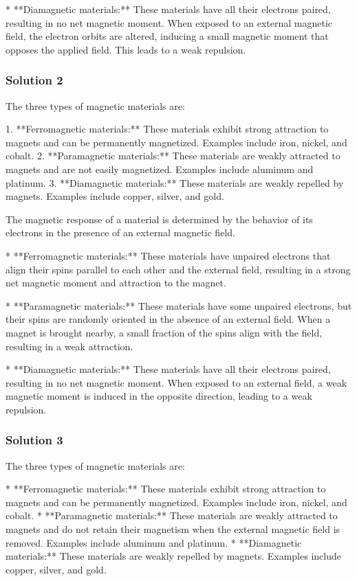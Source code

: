 \documentclass{article}
\begin{document}
*   **Diamagnetic materials:** These materials have all their electrons paired, resulting in no net magnetic moment. When exposed to an external magnetic field, the electron orbits are altered, inducing a small magnetic moment that opposes the applied field. This leads to a weak repulsion.


\subsubsection{Solution 2}
The three types of magnetic materials are:

1.  **Ferromagnetic materials:** These materials exhibit strong attraction to magnets and can be permanently magnetized. Examples include iron, nickel, and cobalt.
2.  **Paramagnetic materials:** These materials are weakly attracted to magnets and are not easily magnetized. Examples include aluminum and platinum.
3.  **Diamagnetic materials:** These materials are weakly repelled by magnets. Examples include copper, silver, and gold.

The magnetic response of a material is determined by the behavior of its electrons in the presence of an external magnetic field.

*   **Ferromagnetic materials:** These materials have unpaired electrons that align their spins parallel to each other and the external field, resulting in a strong net magnetic moment and attraction to the magnet.

*   **Paramagnetic materials:** These materials have some unpaired electrons, but their spins are randomly oriented in the absence of an external field. When a magnet is brought nearby, a small fraction of the spins align with the field, resulting in a weak attraction.

*   **Diamagnetic materials:** These materials have all their electrons paired, resulting in no net magnetic moment. When exposed to an external field, a weak magnetic moment is induced in the opposite direction, leading to a weak repulsion.

\subsubsection{Solution 3}
The three types of magnetic materials are:

* **Ferromagnetic materials:** These materials exhibit strong attraction to magnets and can be permanently magnetized. Examples include iron, nickel, and cobalt.
* **Paramagnetic materials:** These materials are weakly attracted to magnets and do not retain their magnetism when the external magnetic field is removed. Examples include aluminum and platinum.
* **Diamagnetic materials:** These materials are weakly repelled by magnets. Examples include copper, silver, and gold.
\end{document}
